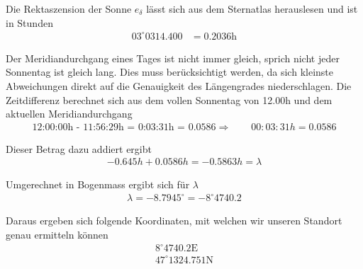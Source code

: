 \begin{refsection}
Die Rektaszension der Sonne $e_\delta$ lässt sich aus dem Sternatlas herauslesen und ist in Stunden
\begin{align*}
03^{\circ} 03 14.400 &= 0.2036 \text{h}
\end{align*}

Der Meridiandurchgang eines Tages ist nicht immer gleich, sprich nicht jeder Sonnentag ist gleich lang. Dies muss berücksichtigt werden, da sich kleinste Abweichungen direkt auf die Genauigkeit des Längengrades niederschlagen.
Die Zeitdifferenz berechnet sich aus dem vollen Sonnentag von 12.00h und dem aktuellen Meridiandurchgang
\begin{align*}
\text{12:00:00h - 11:56:29h = 0:03:31h = 0.0586}
\Rightarrow \quad \quad
00:03:31h = 0.0586
\end{align*}






Dieser Betrag dazu addiert ergibt
\begin{align*}
-0.645 h + 0.0586 h = - 0.5863 h = \lambda
\end{align*}

Umgerechnet in Bogenmass ergibt sich für $\lambda$
\begin{align*}
\lambda = - 8.7945^{\circ} = -8^{\circ} 47 40.2
\end{align*}



Daraus ergeben sich folgende Koordinaten, mit welchen wir unseren Standort genau ermitteln können
\begin{align*}
8^{\circ}47 40.2 \text{E} \\
47^{\circ}13 24.751 \text{N}
\end{align*}




\printbibliography[heading=subbibliography]
\end{refsection}







